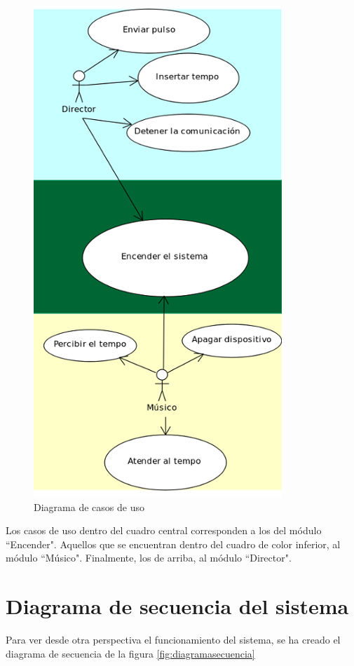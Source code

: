 \begin{figure}[!htb]
\centering
\includegraphics[]{./imagenes/diagramacasosdeuso}
\caption{Diagrama de casos de uso} \label{fig:diagramacasosdeuso}
\end{figure}

Los casos de uso dentro del cuadro central corresponden a los del módulo ``Encender".
Aquellos que se encuentran dentro del cuadro de color inferior, al módulo ``Músico". Finalmente,
los de arriba, al módulo ``Director".\\


\section{Diagrama de secuencia del sistema}
Para ver desde otra perspectiva el funcionamiento del sistema, se ha creado el diagrama
de secuencia de la figura \ref{fig:diagramasecuencia}\\


